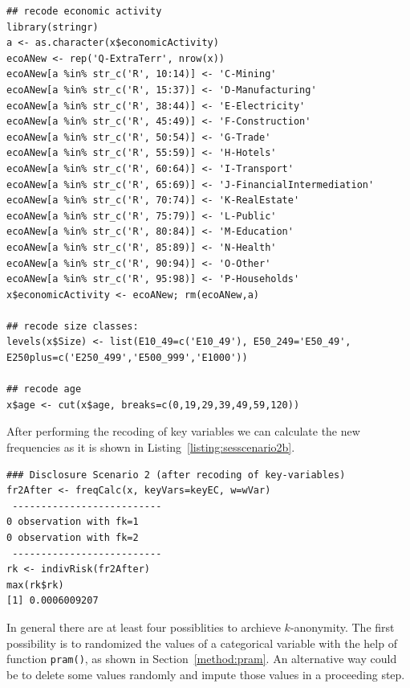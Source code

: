 \documentclass[12pt]{article}
\begin{document}

\begin{lstlisting}[numbers=none,captionpos=b, caption={Recoding economic activity, size and age.}, label=listing:sesRecode]
## recode economic activity
library(stringr)
a <- as.character(x$economicActivity)
ecoANew <- rep('Q-ExtraTerr', nrow(x))
ecoANew[a %in% str_c('R', 10:14)] <- 'C-Mining'
ecoANew[a %in% str_c('R', 15:37)] <- 'D-Manufacturing'
ecoANew[a %in% str_c('R', 38:44)] <- 'E-Electricity'
ecoANew[a %in% str_c('R', 45:49)] <- 'F-Construction'
ecoANew[a %in% str_c('R', 50:54)] <- 'G-Trade'
ecoANew[a %in% str_c('R', 55:59)] <- 'H-Hotels'
ecoANew[a %in% str_c('R', 60:64)] <- 'I-Transport'
ecoANew[a %in% str_c('R', 65:69)] <- 'J-FinancialIntermediation'
ecoANew[a %in% str_c('R', 70:74)] <- 'K-RealEstate'
ecoANew[a %in% str_c('R', 75:79)] <- 'L-Public'
ecoANew[a %in% str_c('R', 80:84)] <- 'M-Education'
ecoANew[a %in% str_c('R', 85:89)] <- 'N-Health'
ecoANew[a %in% str_c('R', 90:94)] <- 'O-Other'
ecoANew[a %in% str_c('R', 95:98)] <- 'P-Households'
x$economicActivity <- ecoANew; rm(ecoANew,a)

## recode size classes:
levels(x$Size) <- list(E10_49=c('E10_49'), E50_249='E50_49', E250plus=c('E250_499','E500_999','E1000')) 
		
## recode age		
x$age <- cut(x$age, breaks=c(0,19,29,39,49,59,120))
\end{lstlisting}


After performing the recoding of key variables we can calculate the new frequencies as it is shown in Listing~\ref{listing:sesscenario2b}.

\begin{lstlisting}[numbers=none,captionpos=b, caption={Frequency calculation based on the recoded variables.}, label=listing:sesscenario2b]
### Disclosure Scenario 2 (after recoding of key-variables)
fr2After <- freqCalc(x, keyVars=keyEC, w=wVar)
 --------------------------
0 observation with fk=1 
0 observation with fk=2 
 --------------------------
rk <- indivRisk(fr2After)
max(rk$rk)
[1] 0.0006009207
\end{lstlisting}

In general there are at least four possiblities to archieve $k$-anonymity. The first possibility is to randomized the values of a categorical variable 
with the help of function \lstinline{pram()}, as shown in Section~\ref{method:pram}. An alternative way could be to delete some values randomly and impute those values in a proceeding step.  
\end{document}
